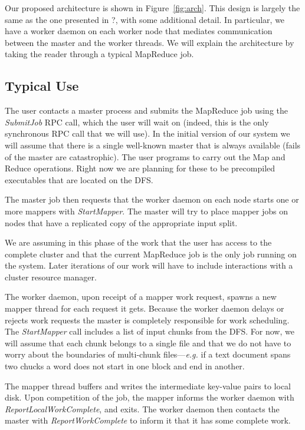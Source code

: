 \documentclass[10pt,letter,final,article,twocolumn]{article} %
\newcommand{\rpc}[1]{\emph{#1}}
\begin{document}
Our proposed architecture is shown in Figure~\ref{fig:arch}. This design is largely the same as the one presented in 
?, with some additional detail. In particular, we have a worker daemon on each worker node that mediates communication between the master and the worker threads. We will explain the architecture by taking the reader through a typical MapReduce job.

\subsection{Typical Use}

The user contacts a master process and submits the MapReduce job using the \rpc{SubmitJob} RPC call, which the user will wait on (indeed, this is the only synchronous RPC call  that we will use). In the initial version of our system we will assume that there is a single well-known master that is always available (fails of the master are catastrophic). The user programs to carry out the Map and Reduce operations. Right now we are planning for these to be precompiled executables that are located on the DFS.

The master job then requests that the worker daemon on each node starts one or more mappers with \rpc{StartMapper}. The master will try to place mapper jobs on nodes that have a replicated copy of the appropriate input split.

We are assuming in this phase of the work that the user has access to the complete cluster and that the current MapReduce job is the only job running on the system. Later iterations of our work will have to include interactions with a cluster resource manager.

 The worker daemon, upon receipt of a mapper work request, spawns a new mapper thread for each request it gets. Because the worker daemon delays or rejects work requests the master is completely responsible for work scheduling. The  \rpc{StartMapper} call includes a list of input chunks from the DFS. For now, we will assume that each chunk belongs to a single file and that we do not have to worry about the boundaries of multi-chunk files---\textit{e.g.} if a text document spans two chucks a word does not start in one block and end in another.

The mapper thread buffers and writes the intermediate key-value pairs to local disk. Upon competition of the job, the mapper informs the worker daemon with \rpc{ReportLocalWorkComplete}, and exits. The worker daemon then contacts the master with \rpc{ReportWorkComplete} to inform it that it has some complete work.
\end{document}

